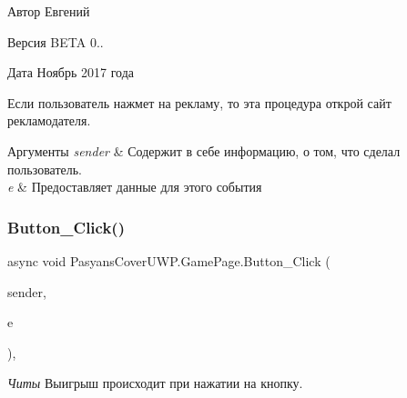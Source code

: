\begin{DoxyAuthor}{Автор}
Евгений 
\end{DoxyAuthor}
\begin{DoxyVersion}{Версия}
B\+E\+TA 0.. 
\end{DoxyVersion}
\begin{DoxyDate}{Дата}
Ноябрь 2017 года
\end{DoxyDate}
Если пользователь нажмет на рекламу, то эта процедура открой сайт рекламодателя. 
\begin{DoxyParams}{Аргументы}
{\em sender} & Содержит в себе информацию, о том, что сделал пользователь. \\
\hline
{\em e} & Предоставляет данные для этого события \\
\hline
\end{DoxyParams}
\mbox{\label{class_pasyans_cover_u_w_p_1_1_game_page_af17d3b02f3db6ba2e95e1d735abfdece}} 
\subsubsection{\texorpdfstring{Button\+\_\+\+Click()}{Button\_Click()}}
{\footnotesize\ttfamily async void Pasyans\+Cover\+U\+W\+P.\+Game\+Page.\+Button\+\_\+\+Click (\begin{DoxyParamCaption}\item[{object}]{sender,  }\item[{Routed\+Event\+Args}]{e }\end{DoxyParamCaption})\hspace{0.3cm}{\ttfamily [inline]}, {\ttfamily [private]}}



{\itshape Читы} Выигрыш происходит при нажатии на кнопку. 

